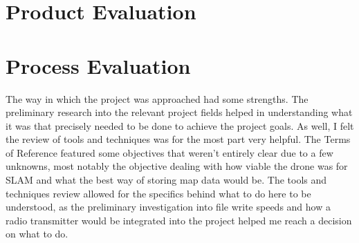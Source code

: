 	\chapter{Product Evaluation}
	
	
	
	
	\chapter{Process Evaluation}
	\label{evaluation:processevaluation}
	
	The way in which the project was approached had some strengths. The preliminary research into the relevant project fields helped in understanding what it was that precisely needed to be done to achieve the project goals. As well, I felt the review of tools and techniques was for the most part very helpful. The Terms of Reference featured some objectives that weren't entirely clear due to a few unknowns, most notably the objective dealing with how viable the drone was for SLAM and what the best way of storing map data would be. The tools and techniques review allowed for the specifics behind what to do here to be understood, as the preliminary investigation into file write speeds and how a radio transmitter would be integrated into the project helped me reach a decision on what to do.
	
